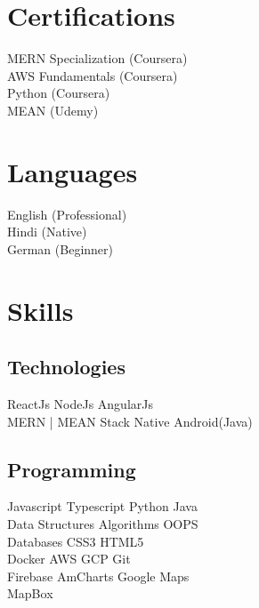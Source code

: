 \documentclass[]{deedy-resume-openfont}
\begin{document}
\begin{minipage}[t]{0.33\textwidth}

\section{Certifications}
MERN Specialization (Coursera) \\
AWS Fundamentals (Coursera) \\
Python (Coursera) \\
MEAN (Udemy) \\
\sectionsep
\section{Languages}
English (Professional) \\
Hindi (Native) \\
German (Beginner) \\
\sectionsep

\section{Skills}
\subsection{Technologies}
ReactJs \textbullet{} NodeJs \textbullet{} AngularJs \\
MERN | MEAN Stack \textbullet{} Native Android(Java) \\
\sectionsep

\subsection{Programming}
Javascript \textbullet{}   Typescript \textbullet{} Python \textbullet{} Java \\
Data Structures \textbullet{}   Algorithms \textbullet{} OOPS \\
Databases \textbullet{} CSS3 \textbullet{} HTML5 \\
Docker \textbullet{} AWS \textbullet{} GCP \textbullet{} Git \\
Firebase \textbullet{} AmCharts \textbullet{} Google Maps \\
MapBox \textbullet{} \\

%
%

\end{minipage} 
\end{document}
